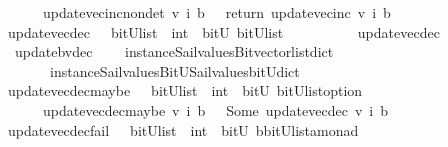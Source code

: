 \begin{isabellebody}
\ \ \ \ \ {\isachardoublequoteopen}\ update{\isacharunderscore}vec{\isacharunderscore}inc{\isacharunderscore}nondet\ v\ i\ b\ {\isacharequal}\ {\isacharparenleft}\ return\ {\isacharparenleft}update{\isacharunderscore}vec{\isacharunderscore}inc\ v\ i\ b{\isacharparenright}{\isacharparenright}{\isachardoublequoteclose}\isanewline
\isanewline
\isanewline
%
\isanewline
{}\isamarkupfalse%
\ update{\isacharunderscore}vec{\isacharunderscore}dec\ \ {\isacharcolon}{\isacharcolon}\ {\isachardoublequoteopen}{\isacharparenleft}bitU{\isacharparenright}list\ {\isasymRightarrow}\ int\ {\isasymRightarrow}\ bitU\ {\isasymRightarrow}{\isacharparenleft}bitU{\isacharparenright}list\ {\isachardoublequoteclose}\ \ \ \isanewline
\ \ \ \ \ {\isachardoublequoteopen}\ update{\isacharunderscore}vec{\isacharunderscore}dec\ {\isacharequal}\ {\isacharparenleft}\ \isanewline
\ \ update{\isacharunderscore}bv{\isacharunderscore}dec\isanewline
\ \ \ \ {\isacharparenleft}instance{\isacharunderscore}Sail{}{\isacharunderscore}values{\isacharunderscore}Bitvector{\isacharunderscore}list{\isacharunderscore}dict\isanewline
\ \ \ \ \ \ \ instance{\isacharunderscore}Sail{}{\isacharunderscore}values{\isacharunderscore}BitU{\isacharunderscore}Sail{}{\isacharunderscore}values{\isacharunderscore}bitU{\isacharunderscore}dict{\isacharparenright}\ {\isacharparenright}{\isachardoublequoteclose}\isanewline
\isanewline
{}\isamarkupfalse%
\ update{\isacharunderscore}vec{\isacharunderscore}dec{\isacharunderscore}maybe\ \ {\isacharcolon}{\isacharcolon}\ {\isachardoublequoteopen}{\isacharparenleft}bitU{\isacharparenright}list\ {\isasymRightarrow}\ int\ {\isasymRightarrow}\ bitU\ {\isasymRightarrow}{\isacharparenleft}{\isacharparenleft}bitU{\isacharparenright}list{\isacharparenright}option\ {\isachardoublequoteclose}\ \ \ \isanewline
\ \ \ \ \ {\isachardoublequoteopen}\ update{\isacharunderscore}vec{\isacharunderscore}dec{\isacharunderscore}maybe\ v\ i\ b\ {\isacharequal}\ {\isacharparenleft}\ Some\ {\isacharparenleft}update{\isacharunderscore}vec{\isacharunderscore}dec\ v\ i\ b{\isacharparenright}{\isacharparenright}{\isachardoublequoteclose}\isanewline
\isanewline
{}\isamarkupfalse%
\ update{\isacharunderscore}vec{\isacharunderscore}dec{\isacharunderscore}fail\ \ {\isacharcolon}{\isacharcolon}\ {\isachardoublequoteopen}{\isacharparenleft}bitU{\isacharparenright}list\ {\isasymRightarrow}\ int\ {\isasymRightarrow}\ bitU\ {\isasymRightarrow}{\isacharparenleft}{\isacharprime}b{\isacharcomma}{\isacharparenleft}{\isacharparenleft}bitU{\isacharparenright}list{\isacharparenright}{\isacharcomma}{\isacharprime}a{\isacharparenright}monad\ {\isachardoublequoteclose}\ \ \ \isanewline

\end{isabellebody}
